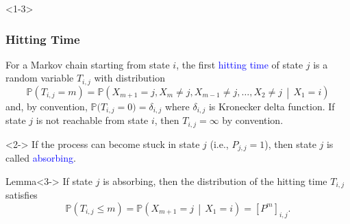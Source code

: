 \documentclass[10pt,english,aspectratio=169]{beamer}
\renewcommand{\Pr}{\mathbb{P}}
\begin{document}
\begin{frame}<1-3> \frametitle{Hitting Time}

\begin{definition}For a Markov chain starting from state $i$, the first \textcolor{blue}{hitting time} of state $j$ is a random variable $T_{i,j}$ with distribution \vspace{-2mm}
\[
\Pr\left(T_{i,j}=m\right)=\Pr\left(X_{m+1}=j,X_{m}\neq j,X_{m-1}\neq j,\ldots,X_{2}\neq j\,\middle|\,X_{1}=i\right)
\]
and, by convention, $\Pr\big(T_{i,j}=0\big)=\delta_{i,j}$ where $\delta_{i,j}$ is Kronecker delta function. If state $j$ is not reachable from state $i$, then $T_{i,j} = \infty$ by convention.
\end{definition}

\begin{definition}<2->
If the process can become stuck in state $j$ (i.e., $P_{j,j} = 1$), then state $j$ is called \textcolor{blue}{absorbing}.
\end{definition}

\begin{exampleblock}{Lemma}<3->
If state $j$ is absorbing, then the distribution of the hitting time $T_{i,j}$ satisfies \vspace{-2mm}
\[
\Pr\left(T_{i,j}\leq m\right)=\Pr\left(X_{m+1}=j\,\middle|\,X_{1}=i\right)=\left[P^{m}\right]_{i,j}.
\]
\end{exampleblock}


\end{frame}
\end{document}
